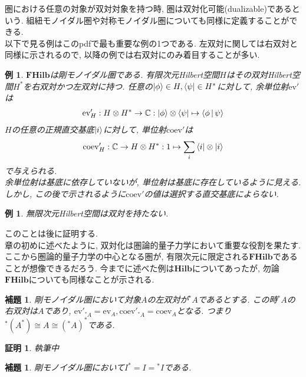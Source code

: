 \documentclass[a4paper,12pt]{ltjsarticle}
\theoremstyle{break}
\newtheorem{lem}[thm]{補題}
\newtheorem{eg}[thm]{例}
\newtheorem*{prf}{証明}
\newcommand{\hilb}{\mathbf{Hilb}}
\newcommand{\fhilb}{\mathbf{FHilb}}
\newcommand{\mbc}{\mathbb{C}}
\newcommand{\eva}{\mathrm{ev}}
\newcommand{\coev}{\mathrm{coev}}
\newcommand{\mt}{\mapsto}
\newcommand{\ot}{\otimes}
\numberwithin{equation}{section}
\begin{document}
圏における任意の対象が双対対象を持つ時, 圏は双対化可能(dualizable)であるという. 
組紐モノイダル圏や対称モノイダル圏についても同様に定義することができる. \\

以下で見る例はこのpdfで最も重要な例の1つである. 
左双対に関しては右双対と同様に示されるので, 以降の例では右双対にのみ着目することが多い. 

\begin{eg}
  $\fhilb$は剛モノイダル圏である. 
  有限次元Hilbert空間$H$はその双対Hilbert空間$H^*$を右双対かつ左双対に持つ.  
  任意の$\ket{\phi} \in H, \bra{\psi} \in H^*$に対して, 余単位射$\eva'$は
  \begin{align*}
    \eva'_H: H \ot H^* \to \mbc: \ket{\phi} \ot \bra{\psi} \mt \Braket{\phi|\psi}
  \end{align*}
  $H$の任意の正規直交基底$\ket{i}$に対して, 単位射$\coev'$は
  \begin{align*}
    \coev'_H: \mbc \to H \ot H^*: 1 \mt \sum_i \bra{i} \ot \ket{i}
  \end{align*}
  で与えられる. \\
  余単位射は基底に依存していないが, 単位射は基底に存在しているように見える. 
  しかし, この後で示されるように$\coev'$の値は選択する直交基底によらない. 
\end{eg}

\begin{eg}
  無限次元Hilbert空間は双対を持たない. 
\end{eg}

このことは後に証明する. \\

章の初めに述べたように, 双対化は圏論的量子力学において重要な役割を果たす. 
ここから圏論的量子力学の中心となる圏が, 有限次元に限定される$\fhilb$であることが想像できるだろう. 
今までに述べた例は$\hilb$についてあったが, 勿論$\fhilb$についても同様なことが示される. 

\begin{lem}
  剛モノイダル圏において対象$A$の左双対が${}^*A$であるとする. 
  この時${}^*A$の右双対は$A$であり, $\eva'_{{}^*A}=\eva_A, \coev'_{{}^*A}=\coev_A$となる.
  つまり${}^*(A^*) \cong A \cong ({}^*A)^*$である.  
\end{lem}

\begin{prf}
  執筆中
\end{prf}

\begin{lem}
  剛モノイダル圏において$I^*=I={}^*I$である. 
\end{lem}
\end{document}
